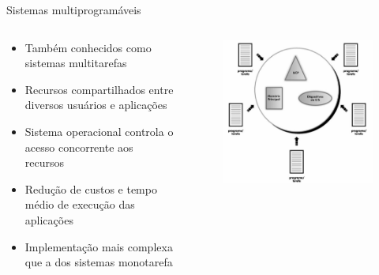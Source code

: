 \documentclass[aspectratio=169,
				xcolor=table]{beamer}
\begin{document}
	\begin{frame}{Sistemas multiprogramáveis}
		\begin{columns}
			\begin{column}{0.5\textwidth}
				\begin{itemize}
					\item Também conhecidos como sistemas multitarefas
					\vspace{0.8em}
					\item Recursos compartilhados entre diversos usuários e aplicações
					\vspace{0.8em}
					\item Sistema operacional controla o acesso concorrente aos recursos
					\vspace{0.8em}
					\item Redução de custos e tempo médio de execução das aplicações
					\vspace{0.8em}
					\item Implementação mais complexa que a dos sistemas monotarefa
				\end{itemize}
			\end{column}
			\begin{column}{0.5\textwidth}			
				\begin{figure}[hbtp]
					\centering
					\includegraphics[width=.85\textwidth, keepaspectratio]{../figs/cap01/multitarefa.png}
				\end{figure}
			\end{column}
		\end{columns}
	\end{frame}
		
\end{document}
